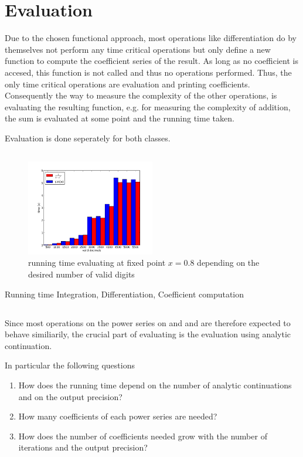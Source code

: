	\section{Evaluation}
		Due to the chosen functional approach, most operations like differentiation do by themselves not perform any time critical operations but only define a new function to compute the coefficient series of the result.
		As long as no coefficient is accesed, this function is not called and thus no operations performed.
		Thus, the only time critical operations are evaluation and printing coefficients.
		Consequently the way to measure the complexity of the other operations, is evaluating the resulting function, 
		e.g. for measuring the complexity of addition, the sum is evaluated at some point and the running time taken.


		Evaluation is done seperately for both classes.
		\subsection{\baana}
			\begin{figure}[H]
				\centering
				\includegraphics[width=0.5\textwidth]{img/analytic/ba_ana_dep_on_n_bar.png}
				\caption{running time evaluating \baana at fixed point $x=0.8$ depending on the desired number of valid digits}
				\label{fig:ba_ana dep on n}
			\end{figure}
			Running time Integration, Differentiation, Coefficient computation 
		\subsection{\anarect}
			Since most operations on the power series on \anarect and \baana and are therefore expected to behave similiarily, 
			the crucial part of evaluating \baana is the evaluation using analytic continuation.
			
			In particular the following questions
			\begin{enumerate}
				\item How does the running time depend on the number of analytic continuations and on the output precision?
				\item How many coefficients of each power series are needed?
				\item How does the number of coefficients needed grow with the number of iterations and the output precision?
			\end{enumerate} 

